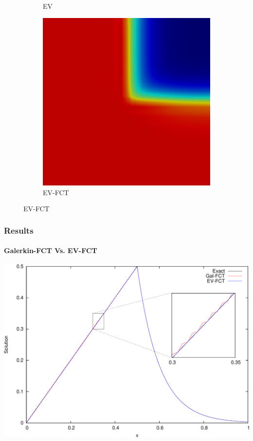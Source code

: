 \documentclass{beamer}
\begin{document}
\begin{frame}
\begin{figure}[h]
\begin{subfigure}{0.3\textwidth}
      \caption{EV}
   \end{subfigure}
   \begin{subfigure}{0.3\textwidth}
      \includegraphics[width=\textwidth]{./figures/skew_EVFCT.png}
      \caption{EV-FCT}
   \end{subfigure}
\end{figure}

\end{frame}
\begin{frame}
\frametitle{Results}
\framesubtitle{Galerkin-FCT Vs. EV-FCT}

\includegraphics[width=\textwidth]{./figures/sourcevoid_FCT_comparison.pdf}

\end{frame}
\end{document}
